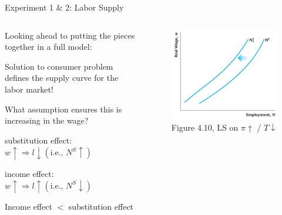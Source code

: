 \documentclass[11pt,aspectratio=169,usenames,dvipsnames]{beamer}
\let\tempone\itemize
\let\temptwo\enditemize
\renewenvironment{itemize}{\tempone\addtolength{\itemsep}{\fill}}{\temptwo}
\begin{document}
\begin{frame}{Experiment 1 \& 2: Labor Supply}
\label{slide:Experiment_1____2__Labor_Supply}

    \begin{columns}
        \begin{column}{0.5\textwidth}
        Looking ahead to putting the pieces together in a full model:
        \begin{itemize}
            \item Solution to consumer problem defines the supply curve for the labor market!
            \item What assumption ensures this is increasing in the wage?
            \begin{itemize}
                \item substitution effect: $ w \uparrow \Rightarrow l \downarrow (\text{i.e., } N^{S} \uparrow ) $
                \item income effect: $ w \uparrow \Rightarrow l \uparrow  (\text{i.e., } N^{S} \downarrow ) $
                \item Income effect $ < $ substitution effect
            \end{itemize}
        \end{itemize}
        \end{column}
        \begin{column}{0.5\textwidth}
            \begin{figure}
                \caption{Figure 4.10, LS on $ \pi \uparrow $ / $ T \downarrow  $}
                \includegraphics[width=\textwidth]{./figures/Figure4_10.jpg}
            \end{figure}
        \end{column}
    \end{columns}
\end{frame}
\end{document}
